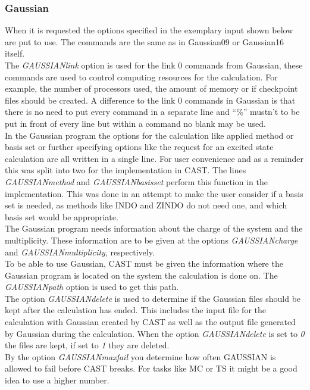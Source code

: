 \documentclass[10pt,a4paper]{article} %
\begin{document}
			\subsubsection{Gaussian}
 When it is requested the options specified in the exemplary input shown below are put to use. The commands are the same as in Gaussian09\supercite{M.J.Frisch2009} or Gaussian16 itself.\\
The \textit{GAUSSIANlink} option is used for the link 0 commands from Gaussian, these commands are used to control computing resources for the calculation. For example, the number of processors used, the amount of memory or if checkpoint files should be created. A difference to the link 0 commands in Gaussian is that there is no need to put every command in a separate line and ``\%'' mustn't to be put in front of every line but within a command no blank may be used.\\
In the Gaussian program the options for the calculation like applied method or basis set or further specifying options like the request for an excited state calculation are all written in a single line. For user convenience and as a reminder this was split into two for the implementation in CAST. The lines \textit{GAUSSIANmethod} and \textit{GAUSSIANbasisset} perform this function in the implementation. This was done in an attempt to make the user consider if a basis set is needed, as methods like INDO\supercite{Pople1967} and ZINDO\supercite{Ridley1973,Ridley1976} do not need one, and which basis set would be appropriate.\\
The Gaussian program needs information about the charge of the system and the multiplicity. These information are to be given at the options \textit{GAUSSIANcharge} and \textit{GAUSSIANmultiplicity}, respectively.\\
To be able to use Gaussian, CAST must be given the information where the Gaussian program is located on the system the calculation is done on. The \textit{GAUSSIANpath} option is used to get this path.\\
The option \textit{GAUSSIANdelete} is used to determine if the Gaussian files should be kept after the calculation has ended. This includes the input file for the calculation with Gaussian created by CAST as well as the output file generated by Gaussian during the calculation. When the option \textit{GAUSSIANdelete} is set to \textit{0} the files are kept, if set to \textit{1} they are deleted.\\
By the option \textit{GAUSSIANmaxfail} you determine how often GAUSSIAN is allowed to fail before CAST breaks. For tasks like MC or TS it might be a good idea to use a higher number.\\
\end{document}
